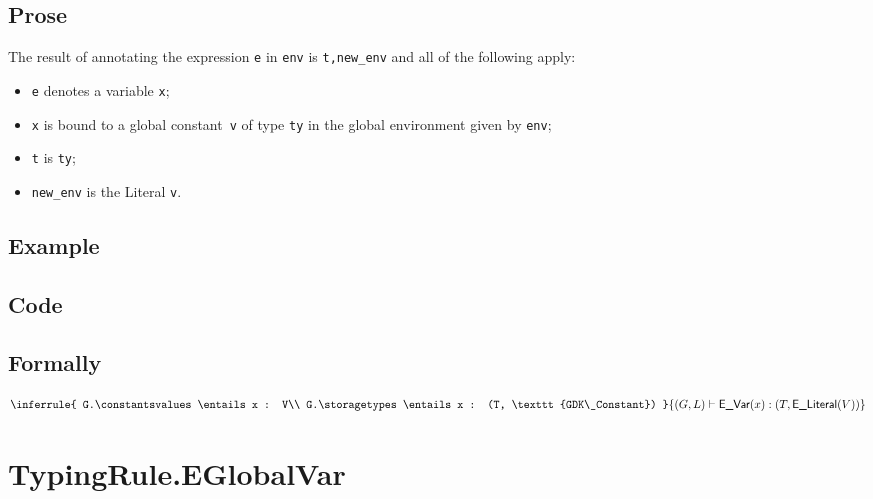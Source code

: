 \documentclass{book}
\newcommand\eliteral[1]{\textsf{E\_Literal}(#1)}
\begin{document}
  \subsection{Prose}
  The result of annotating the expression \texttt{e} in \texttt{env} is
\texttt{t,new\_env} and all of the following apply: 
  \begin{itemize}
  \item \texttt{e} denotes a variable \texttt{x};
  \item \texttt{x} is bound to a global constant~\texttt{v} of type \texttt{ty} in the global environment given by \texttt{env};
  \item \texttt{t} is \texttt{ty};
  \item \texttt{new\_env} is the Literal \texttt{v}.
  \end{itemize}

  \subsection{Example}

  \subsection{Code}

\begin{emptyformal}
  \subsection{Formally}
\[
\inferrule{
  G.\constantsvalues \entails x : V\\
  G.\storagetypes \entails x : (T, \texttt{GDK\_Constant})
  }
{(G,L) \entails \evar(x) : (T, \eliteral{V})}
\]
\end{emptyformal}


\begin{comment}
ROMAN: we seem to be missing TypinRule.EGlobalVarConstantNoVal.
\end{comment}

\section{TypingRule.EGlobalVar \label{sec:TypingRule.EGlobalVar}}
\end{document}

